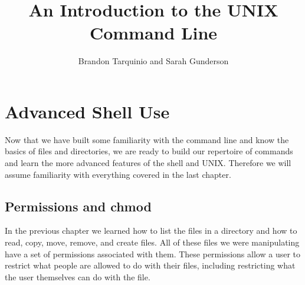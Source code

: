 \documentclass[oneside]{book}
\begin{document}
\title{An Introduction to the UNIX Command Line}
\author{Brandon Tarquinio and Sarah Gunderson}

\maketitle
\tableofcontents
\newpage

\chapter{Advanced Shell Use}
Now that we have built some familiarity with the command line and know the basics of files and directories, we are ready to build our repertoire of commands and learn the more advanced features of the shell and UNIX. Therefore we will assume familiarity with everything covered in the last chapter.

\section{Permissions and chmod}
In the previous chapter we learned how to list the files in a directory and how to read, copy, move, remove, and create files. All of these files we were manipulating have a set of permissions associated with them. These permissions allow a user to restrict what people are allowed to do with their files, including restricting what the user themselves can do with the file. 
\end{document}

